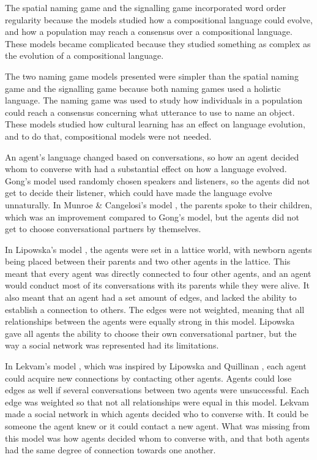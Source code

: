 The spatial naming game and the signalling game incorporated word order regularity because the models studied how a compositional language could evolve, and how a population may reach a consensus over a compositional language. These models became complicated because they studied something as complex as the evolution of a compositional language. 

The two naming game models presented were simpler than the spatial naming game and the signalling game because both naming games used a holistic language. The naming game was used to study how individuals in a population could reach a consensus concerning what utterance to use to name an object. These models studied how cultural learning has an effect on language evolution, and to do that, compositional models were not needed. 

An agent’s language changed based on conversations, so how an agent decided whom to converse with had a substantial effect on how a language evolved. Gong’s model \citep{gong2011simulating} used randomly chosen speakers and listeners, so the agents did not get to decide their listener, which could have made the language evolve unnaturally. In Munroe \& Cangelosi’s model \citep{munroe2002learning}, the parents spoke to their children, which was an improvement compared to Gong’s model, but the agents did not get to choose conversational partners by themselves.

In Lipowska’s model \citep{lipowska2011naming}, the agents were set in a lattice world, with newborn agents being placed between their parents and two other agents in the lattice. This meant that every agent was directly connected to four other agents, and an agent would conduct most of its conversations with its parents while they were alive. It also meant that an agent had a set amount of edges, and lacked the ability to establish a connection to others. The edges were not weighted, meaning that all relationships between the agents were equally strong in this model. Lipowska gave all agents the ability to choose their own conversational partner, but the way a social network was represented had its limitations. 

In Lekvam’s model \citep{lekvam2014co}, which was inspired by Lipowska and Quillinan \citet{lipowska2011naming, quillinan2006social}, each agent could acquire new connections by contacting other agents. Agents could lose edges as well if several conversations between two agents were unsuccessful. Each edge was weighted so that not all relationships were equal in this model. Lekvam made a social network in which agents decided who to converse with. It could be someone the agent knew or it could contact a new agent. What was missing from this model was how agents decided whom to converse with, and that both agents had the same degree of connection towards one another. 

